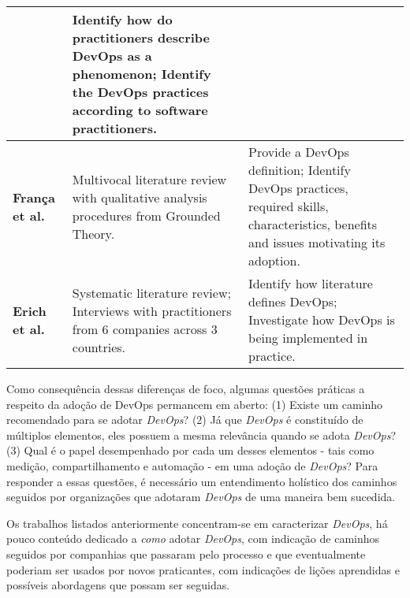 {\begin{table}[hb!]
\begin{tabular}{|p{3cm}|p{6cm}|p{6cm}|}
& Identify how do practitioners describe DevOps as a phenomenon; \newline
\newline Identify the DevOps practices according to software practitioners. \\

\hline

\textbf{Fran\c{c}a et al.~\cite{characterizing_devops}}

& Multivocal literature review with qualitative analysis procedures from
Grounded Theory.

& Provide a DevOps definition; \newline \newline
Identify DevOps practices, required skills, characteristics, benefits and
issues motivating its adoption.  \\

\hline

\textbf{Erich et al.~\cite{qualitative_devops_journalsw_17}}

& Systematic literature review; \newline \newline
Interviews with practitioners from 6 companies across 3 countries.

& Identify how literature defines DevOps; \newline \newline
Investigate how DevOps is being implemented in practice. \\

\hline

\end{tabular}
\end{table}

Como consequência dessas diferenças de foco, algumas questões práticas a
respeito da adoção de DevOps permancem em aberto: (1) Existe um caminho
recomendado para se adotar \textit{DevOps}? (2) Já que \textit{DevOps} é
constituído de múltiplos elementos, eles
possuem a mesma relevância quando se adota \textit{DevOps}? (3) Qual é o papel
desempenhado por cada um desses elementos - tais como medição, compartilhamento e
automação - em uma adoção de \textit{DevOps}? Para responder a essas questões,
é necessário um entendimento holístico dos caminhos seguidos por organizações
que adotaram \textit{DevOps} de uma maneira bem sucedida.

Os trabalhos listados anteriormente concentram-se em caracterizar
\textit{DevOps}, há pouco conteúdo dedicado a \emph{como} adotar \textit{DevOps},
com indicação de caminhos seguidos por companhias que passaram pelo processo
e que eventualmente poderiam ser usados por novos praticantes, com indicações
de lições aprendidas e possíveis abordagens que possam ser seguidas.

}
